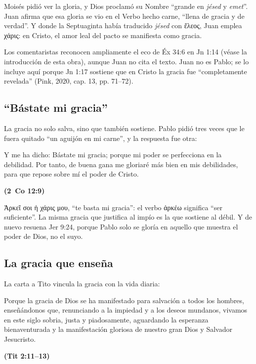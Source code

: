 \documentclass[11pt,letterpaper]{article}
\newcommand{\grc}[1]{\foreignlanguage{ancientgreek}{#1}}
\newcommand{\fuente}[1]{\par\hfill{\upshape\bfseries\small\textcolor{azul}{#1}}}
\begin{document}
Moisés pidió ver la gloria, y Dios proclamó su Nombre ``grande en \emph{jésed} y \emph{emet}''. Juan afirma que esa gloria se vio en el Verbo hecho carne, ``llena de gracia y de verdad''. Y donde la Septuaginta había traducido \emph{jésed} con \grc{ἔλεος}, Juan emplea \grc{χάρις}: en Cristo, el amor leal del pacto se manifiesta como gracia.

\begin{nota}[Precisión]
Los comentaristas reconocen ampliamente el eco de Éx 34:6 en Jn 1:14 (véase la introducción de esta obra), aunque Juan no cita el texto. Juan no es Pablo; se lo incluye aquí porque Jn 1:17 sostiene que en Cristo la gracia fue ``completamente revelada'' (Pink, 2020, cap. 13, pp. 71--72).
\end{nota}

\subsection{``Bástate mi gracia''}
La gracia no solo salva, sino que también sostiene. Pablo pidió tres veces que le fuera quitado ``un aguijón en mi carne'', y la respuesta fue otra:

\begin{cita}Y me ha dicho: Bástate mi gracia; porque mi poder se perfecciona en la debilidad. Por tanto, de buena gana me gloriaré más bien en mis debilidades, para que repose sobre mí el poder de Cristo.\fuente{(2~Co 12:9)}\end{cita}

\grc{Ἀρκεῖ σοι ἡ χάρις μου}, ``te basta mi gracia'': el verbo \grc{ἀρκέω} significa ``ser suficiente''. La misma gracia que justifica al impío es la que sostiene al débil. Y de nuevo resuena Jer 9:24, porque Pablo solo se gloría en aquello que muestra el poder de Dios, no el suyo.

\subsection{La gracia que enseña}
La carta a Tito vincula la gracia con la vida diaria:

\begin{cita}Porque la gracia de Dios se ha manifestado para salvación a todos los hombres, enseñándonos que, renunciando a la impiedad y a los deseos mundanos, vivamos en este siglo sobria, justa y piadosamente, aguardando la esperanza bienaventurada y la manifestación gloriosa de nuestro gran Dios y Salvador Jesucristo.\fuente{(Tit 2:11--13)}\end{cita}
\end{document}
